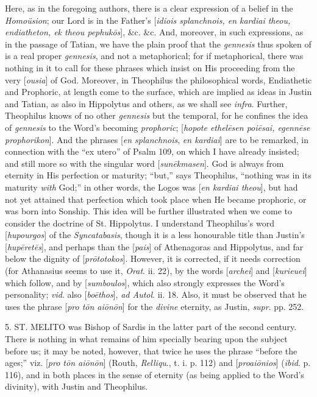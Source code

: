 Here, as in the foregoing authors, there is a clear expression of a
belief in the \emph{Homoüsion}; our Lord is in the Father's [\emph{idiois
splanchnois, en kardiai theou, endiatheton, ek theou pephuk\={o}s}],
\&c. \&c. And, moreover, in such expressions, as in the passage
of Tatian, we have the plain proof that the \emph{gennesis} thus
spoken of is a real proper \emph{gennesis}, and not a metaphorical;
for if metaphorical, there was nothing in it to call for these phrases
which insist on His proceeding from the very [\emph{ousia}] of God.
Moreover, in Theophilus the philosophical words, Endiathetic and
Prophoric, at length come to the surface, which are implied as ideas
in Justin and Tatian, as also in Hippolytus and others, as we shall
see \emph{infra}. Further, Theophilus knows of no other \emph{gennesis}
but the temporal, for he confines the idea of \emph{gennesis} to the
Word's becoming \emph{prophoric}; [\emph{hopote ethel\={e}sen
poi\={e}sai, egenn\={e}se prophorikon}]. And the phrases [\emph{en
splanchnois}, \emph{en kardiai}] are to be remarked, in connection
with the ``ex utero'' of Psalm 109, on which I have
already insisted; and still more so with the singular word [\emph{sun\={e}kmasen}].
God is always from eternity in His perfection or maturity;
``but,'' says Theophilus, ``nothing was in its maturity \emph{with}
God;'' in other words, the Logos was [\emph{en kardiai theou}],
but had not yet attained that perfection which took place when He
became prophoric, or was born into Sonship. This idea will be further
illustrated when we come to consider the doctrine of St. Hippolytus. I
understand Theophilus's word [\emph{hupourgos}] of the \emph{Syncatabasis},
though it is a less honourable title than Justin's [\emph{hup\={e}ret\={e}s}],
and perhaps than the [\emph{pais}] of Athenagoras and Hippolytus, and
far below the dignity of [\emph{pr\={o}totokos}]. However, it is
corrected, if it needs correction (for Athanasius seems to use it, \emph{Orat}.
ii. 22), by the words [\emph{archei}] and [\emph{kurieuei}] which
follow, and by [\emph{sumboulos}], which also strongly expresses
the Word's personality; \emph{vid}. also [\emph{bo\={e}thos}], \emph{ad
Autol}. ii. 18. Also, it must be observed that he uses the phrase [\emph{pro
t\={o}n ai\={o}n\={o}n}] for the \emph{divine} eternity,
as Justin, \emph{supr}. pp. 252.

5. ST. MELITO was
Bishop of Sardis in the latter part of the second century. There is
nothing in what remains of him specially bearing upon the subject
before us; it may be noted, however, that twice he uses the phrase
``before the ages;'' viz. [\emph{pro t\={o}n ai\={o}n\={o}n}]
(Routh, \emph{Relliqu}., t. i. p. 112) and [\emph{proai\={o}nios}]
(\emph{ibid}. p. 116), and in both places in the sense of eternity (as
being applied to the Word's divinity), with Justin and Theophilus.

